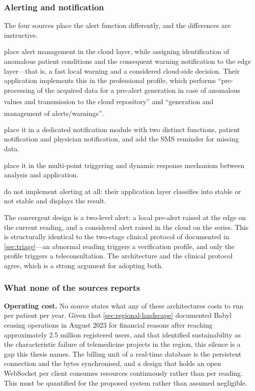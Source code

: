 \documentclass[12pt,a4paper,oneside]{report}
\newcommand{\bq}[1]{``#1''\textsuperscript{\dag}}
\begin{document}
\subsubsection{Alerting and notification}\label{sec:alerting}

The four sources place the alert function differently, and the differences are instructive.

\Textcite{mucchi2021} place alert management in the cloud layer, while assigning identification of anomalous patient conditions and the consequent warning notification to the edge layer---that is, a fast local warning and a considered cloud-side decision. Their application implements this in the professional profile, which performs \bq{pre-processing of the acquired data for a pre-alert generation in case of anomalous values and transmission to the cloud repository} and \bq{generation and management of alerts/warnings}.

\Textcite{yazdani2018} place it in a dedicated notification module with two distinct functions, patient notification and physician notification, and add the SMS reminder for missing data.

\Textcite{liu2025review} place it in the multi-point triggering and dynamic response mechanism between analysis and application.

\Textcite{efendi2025} do not implement alerting at all: their application layer classifies into stable or not stable and displays the result.

The convergent design is a two-level alert: a local pre-alert raised at the edge on the current reading, and a considered alert raised in the cloud on the series. This is structurally identical to the two-stage clinical protocol of \textcite{mihevc2025} documented in \cref{sec:triage}---an abnormal reading triggers a verification profile, and only the profile triggers a teleconsultation. The architecture and the clinical protocol agree, which is a strong argument for adopting both.

\subsubsection{What none of the sources reports}\label{sec:cloud-gaps}

\textbf{Operating cost.} No source states what any of these architectures costs to run per patient per year. Given that \cref{sec:regional-landscape} documented Babyl ceasing operations in August 2023 for financial reasons after reaching approximately 2.5 million registered users, and that \textcite{dodoo2022} identified sustainability as the characteristic failure of telemedicine projects in the region, this silence is a gap this thesis names. The billing unit of a real-time database is the persistent connection and the bytes synchronised, and a design that holds an open WebSocket per client consumes resources continuously rather than per reading. This must be quantified for the proposed system rather than assumed negligible.
\end{document}
